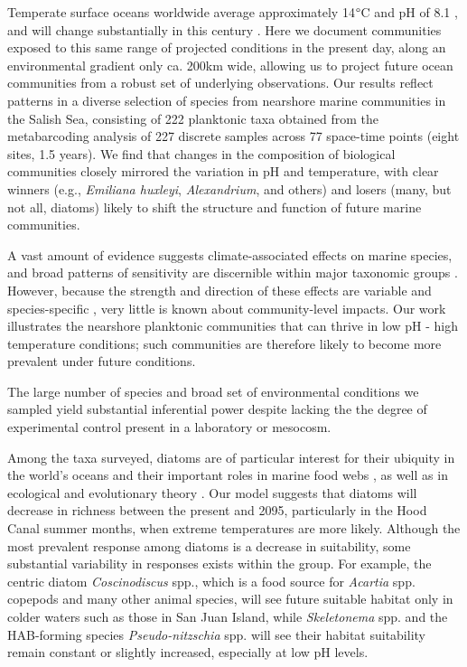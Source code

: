 \documentclass[11pt]{article}
\begin{document}
\begin{linenumbers}
Temperate surface oceans worldwide average approximately 14$\degree$C and pH of 8.1 \cite{bopp2013multiple}, and will change substantially in this century \citep[mean $\Delta$ T 2.5$\degree$C, $\Delta$ pH -0.35 globally; RCP 8.5;][]{gattuso2015contrasting}.  Here we document communities exposed to this same range of projected conditions in the present day, along an environmental gradient only ca. 200km wide, allowing us to project future ocean communities from a robust set of underlying observations. Our results reflect patterns in a diverse selection of species from nearshore marine communities in the Salish Sea, consisting of 222 planktonic taxa obtained from the metabarcoding analysis of 227 discrete samples across 77 space-time points (eight sites, 1.5 years). We find that changes in the composition of biological communities closely mirrored the variation in pH and temperature, with clear winners (e.g., \textit{Emiliana huxleyi}, \textit{Alexandrium}, and others) and losers (many, but not all, diatoms) likely to shift the structure and function of future marine communities.

A vast amount of evidence suggests climate-associated effects on marine species, and broad patterns of sensitivity are discernible within major taxonomic groups  \citep[][among many others]{gattuso2015contrasting, stock2017reconciling}. However, because the strength and direction of these effects are variable and species-specific \cite{kroeker2013impacts}, very little is known about community-level impacts. Our work illustrates the nearshore planktonic communities that can thrive in low pH - high temperature conditions; such communities are therefore likely to become more prevalent under future conditions. 

The large number of species and broad set of environmental conditions we sampled yield substantial inferential power despite lacking the the degree of experimental control present in a laboratory or mesocosm. 

Among the taxa surveyed, diatoms are of particular interest for their ubiquity in the world's oceans and their important roles in marine food webs \cite{armbrust2009life, wasmund2017diatom}, as well as in ecological and evolutionary theory \cite{margalef11978}. Our model suggests that diatoms will decrease in richness between the present and 2095, particularly in the Hood Canal summer months, when extreme temperatures are more likely. Although the most prevalent response among diatoms is a decrease in suitability, some substantial variability in responses exists within the group. For example, the centric diatom \textit{Coscinodiscus} spp., which is a food source for \textit{Acartia} spp. copepods \cite{jansen2008copepods} and many other animal species, will see future suitable habitat only in colder waters such as those in San Juan Island, while \textit{Skeletonema} spp. and the HAB-forming species \textit{Pseudo-nitzschia} spp. will see their habitat suitability remain constant or slightly increased, especially at low pH levels.


\end{linenumbers}
\end{document}
